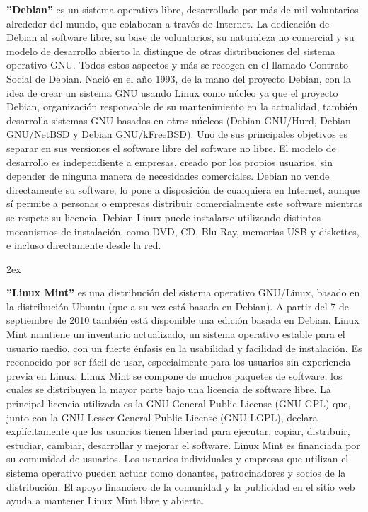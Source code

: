 \documentclass[12pt,a4paper]{report}
\begin{document}
\textbf{''Debian''} es un sistema operativo libre, desarrollado por más de mil
voluntarios alrededor del mundo, que colaboran a través de Internet.  La
dedicación de Debian al software libre, su base de voluntarios, su naturaleza no
comercial y su modelo de desarrollo abierto la distingue de otras distribuciones
del sistema operativo GNU. Todos estos aspectos y más se recogen en el llamado
Contrato Social de Debian.  Nació en el año 1993, de la mano del proyecto
Debian, con la idea de crear un sistema GNU usando Linux como núcleo ya que el
proyecto Debian, organización responsable de su mantenimiento en la actualidad,
también desarrolla sistemas GNU basados en otros núcleos (Debian GNU/Hurd,
Debian GNU/NetBSD y Debian GNU/kFreeBSD).  Uno de sus principales objetivos es
separar en sus versiones el software libre del software no libre. El modelo de
desarrollo es independiente a empresas, creado por los propios usuarios, sin
depender de ninguna manera de necesidades comerciales. Debian no vende
directamente su software, lo pone a disposición de cualquiera en Internet,
aunque sí permite a personas o empresas distribuir comercialmente este software
mientras se respete su licencia.  Debian Linux puede instalarse utilizando
distintos mecanismos de instalación, como DVD, CD, Blu-Ray, memorias USB y
diskettes, e incluso directamente desde la red.

\parskip 2ex

\textbf{''Linux Mint''} es una distribución del sistema operativo GNU/Linux, basado en la
distribución Ubuntu (que a su vez está basada en Debian). A partir del 7 de
septiembre de 2010 también está disponible una edición basada en Debian.  Linux
Mint mantiene un inventario actualizado, un sistema operativo estable para el
usuario medio, con un fuerte énfasis en la usabilidad y facilidad de
instalación. Es reconocido por ser fácil de usar, especialmente para los
usuarios sin experiencia previa en Linux.  Linux Mint se compone de muchos
paquetes de software, los cuales se distribuyen la mayor parte bajo una licencia
de software libre. La principal licencia utilizada es la GNU General Public
License (GNU GPL) que, junto con la GNU Lesser General Public License (GNU
LGPL), declara explícitamente que los usuarios tienen libertad para ejecutar,
copiar, distribuir, estudiar, cambiar, desarrollar y mejorar el software. Linux
Mint es financiada por su comunidad de usuarios. Los usuarios individuales y
empresas que utilizan el sistema operativo pueden actuar como donantes,
patrocinadores y socios de la distribución. El apoyo financiero de la comunidad
y la publicidad en el sitio web ayuda a mantener Linux Mint libre y abierta.
\end{document}
